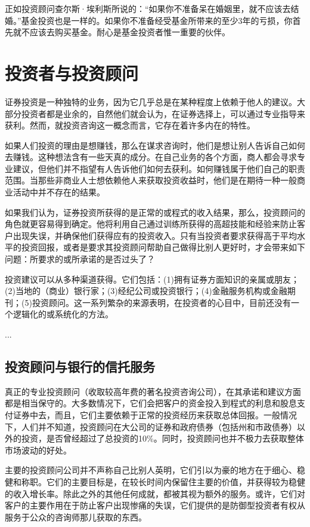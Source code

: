 \documentclass[12pt,oneside]{book}
\begin{document}
正如投资顾问查尔斯·埃利斯所说的：“如果你不准备呆在婚姻里，就不应该去结婚。”基金投资也是一样的。如果你不准备经受基金所带来的至少3年的亏损，你首先就不应该去购买基金。耐心是基金投资者惟一重要的伙伴。


\section{投资者与投资顾问}
证券投资是一种独特的业务，因为它几乎总是在某种程度上依赖于他人的建议。大部分投资者都是业余的，自然他们就会认为，在证券选择上，可以通过专业指导来获利。然而，就投资咨询这一概念而言，它存在着许多内在的特性。

如果人们投资的理由是想赚钱，那么在谋求咨询时，他们是想让别人告诉自己如何去赚钱。这种想法含有一些天真的成分。在自己业务的各个方面，商人都会寻求专业建议，但他们并不指望有人告诉他们如何去获利。如何赚钱属于他们自己的职责范围。当那些非商业人士想依赖他人来获取投资收益时，他们是在期待一种一般商业活动中并不存在的结果。

如果我们认为，证券投资所获得的是正常的或程式的收入结果，那么，投资顾问的角色就更容易得到确定。他将利用自己通过训练所获得的高超技能和经验来防止客户出现失误，并确保他们获得应有的投资收入。只有当投资者要求获得高于平均水平的投资回报，或者是要求其投资顾问帮助自己做得比别人更好时，才会带来如下问题：所要求的或所承诺的是否过头了？

投资建议可以从多种渠道获得。它们包括：(1)拥有证券方面知识的亲属或朋友；(2)当地的（商业）银行家；(3)经纪公司或投资银行；(4)金融服务机构或金融期刊；(5)投资顾问。这一系列繁杂的来源表明，在投资者的心目中，目前还没有一个逻辑化的或系统化的方法。

...

\subsection{投资顾问与银行的信托服务}
真正的专业投资顾问（收取较高年费的著名投资咨询公司），在其承诺和建议方面都是相当保守的。大多数情况下，它们会把客户的资金投入到程式的利息和股息支付证券中去，而且，它们主要依赖于正常的投资经历来获取总体回报。一般情况下，人们并不知道，投资顾问在大公司的证券和政府债券（包括州和市政债券）以外的投资，是否曾经超过了总投资的10\%。同时，投资顾问也并不极力去获取整体市场波动的好处。

主要的投资顾问公司并不声称自己比别人英明，它们引以为豪的地方在于细心、稳健和称职。它们的主要目标是，在较长时间内保留住主要的价值，并获得较为稳健的收入增长率。除此之外的其他任何成就，都被其视为额外的服务。或许，它们对客户的主要作用在于防止客户出现惨痛的失误，它们提供的是防御型投资者有权从服务于公众的咨询师那儿获取的东西。
\end{document}
